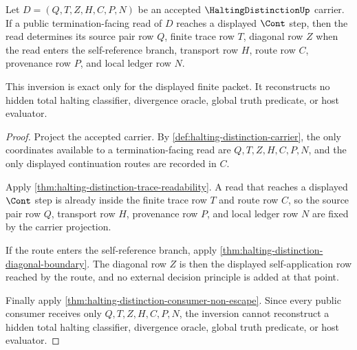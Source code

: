 \begin{theorem}
\label{thm:halting-distinction-finite-trace-inversion}
Let $D=(Q,T,Z,H,C,P,N)$ be an accepted $\HaltingDistinctionUp$ carrier. If a public termination-facing read of $D$ reaches a displayed $\Cont$ step, then the read determines its source pair row $Q$, finite trace row $T$, diagonal row $Z$ when the read enters the self-reference branch, transport row $H$, route row $C$, provenance row $P$, and local ledger row $N$.

This inversion is exact only for the displayed finite packet. It reconstructs no hidden total halting classifier, divergence oracle, global truth predicate, or host evaluator.
\end{theorem}
\begin{proof}
Project the accepted carrier. By \autoref{def:halting-distinction-carrier}, the only coordinates available to a termination-facing read are $Q,T,Z,H,C,P,N$, and the only displayed continuation routes are recorded in $C$.

Apply \autoref{thm:halting-distinction-trace-readability}. A read that reaches a displayed $\Cont$ step is already inside the finite trace row $T$ and route row $C$, so the source pair row $Q$, transport row $H$, provenance row $P$, and local ledger row $N$ are fixed by the carrier projection.

If the route enters the self-reference branch, apply \autoref{thm:halting-distinction-diagonal-boundary}. The diagonal row $Z$ is then the displayed self-application row reached by the route, and no external decision principle is added at that point.

Finally apply \autoref{thm:halting-distinction-consumer-non-escape}. Since every public consumer receives only $Q,T,Z,H,C,P,N$, the inversion cannot reconstruct a hidden total halting classifier, divergence oracle, global truth predicate, or host evaluator.
\end{proof}

